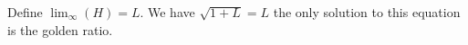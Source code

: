 \documentclass[12pt,fleqn,answers]{exam}
\begin{document}
\begin{questions}
\begin{parts}
\begin{solution}
Define $\displaystyle \lim_{\infty} (H)= L$. We have $\sqrt{1+L} = L$ the only
solution to this equation is the golden ratio. 
\end{solution}



\end{parts}

\end{questions}
\end{document}
